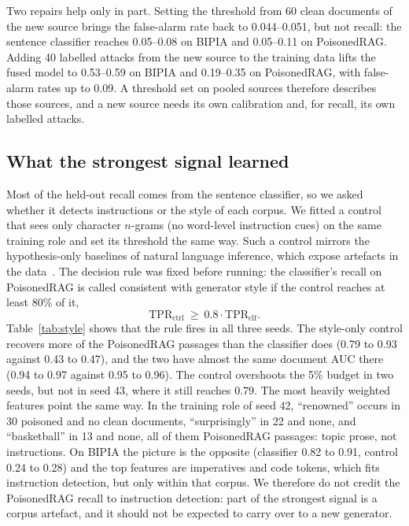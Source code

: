 Two repairs help only in part. Setting the threshold from 60 clean documents of
the new source brings the false-alarm rate back to 0.044--0.051, but not recall:
the sentence classifier reaches 0.05--0.08 on BIPIA and 0.05--0.11 on
PoisonedRAG. Adding 40 labelled attacks from the new source to the training data
lifts the fused model to 0.53--0.59 on BIPIA and 0.19--0.35 on PoisonedRAG, with
false-alarm rates up to 0.09. A threshold set on pooled sources therefore
describes those sources, and a new source needs its own calibration and, for
recall, its own labelled attacks.

\subsection{What the strongest signal learned}
\label{sec:learned}
Most of the held-out recall comes from the sentence classifier, so we asked
whether it detects instructions or the style of each corpus. We fitted a control
that sees only character $n$-grams (no word-level instruction cues) on the same
training role and set its threshold the same way. Such a control mirrors the
hypothesis-only baselines of natural language inference, which expose artefacts in
the data~\cite{poliak2018hypothesis}. The decision rule was fixed
before running: the classifier's recall on PoisonedRAG is called consistent with
generator style if the control reaches at least 80\% of it,
\begin{equation}
    \mathrm{TPR}_{\mathrm{ctrl}}\ \ge\ 0.8\cdot\mathrm{TPR}_{\mathrm{clf}} .
    \label{eq:stylerule}
\end{equation}
Table~\ref{tab:style} shows that the rule fires in all three seeds. The
style-only control recovers more of the PoisonedRAG passages than the classifier
does (0.79 to 0.93 against 0.43 to 0.47), and the two have almost the same
document AUC there (0.94 to 0.97 against 0.95 to 0.96). The control overshoots the
5\% budget in two seeds, but not in seed 43, where it still reaches 0.79. The
most heavily weighted features point the same way. In the training role of seed
42, ``renowned'' occurs in 30 poisoned and no clean documents, ``surprisingly''
in 22 and none, and ``basketball'' in 13 and none, all of them PoisonedRAG
passages: topic prose, not instructions. On BIPIA the picture is the opposite
(classifier 0.82 to 0.91, control 0.24 to 0.28) and the top features are
imperatives and code tokens, which fits instruction detection, but only within
that corpus. We therefore do not credit the PoisonedRAG recall to instruction
detection: part of the strongest signal is a corpus artefact, and it should not
be expected to carry over to a new generator.

